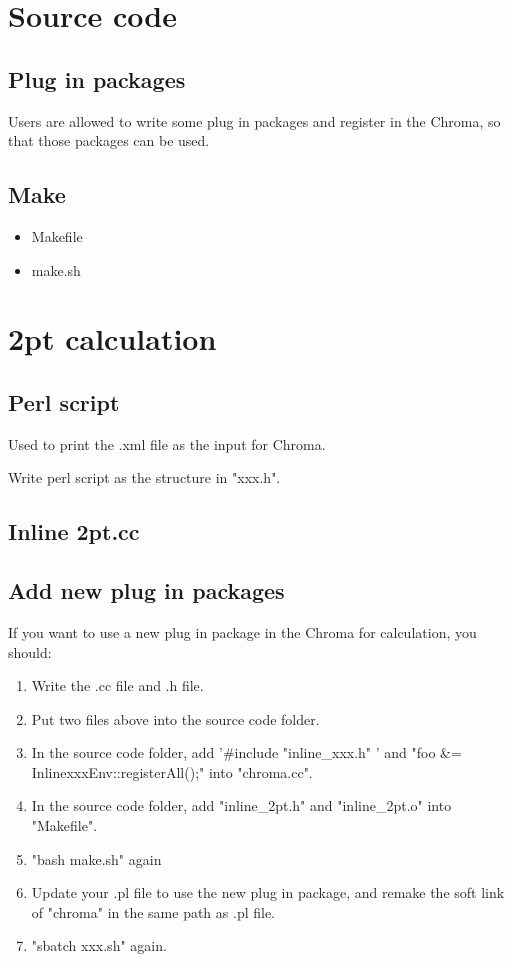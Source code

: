 \documentclass{article}
\begin{document}
\section{Source code}

\subsection{Plug in packages}

Users are allowed to write some plug in packages and register in the Chroma, so that those packages can be used.

\subsection{Make}

\begin{itemize}
    \item Makefile
    \item make.sh 
\end{itemize}

\section{2pt calculation}

\subsection{Perl script}

Used to print the .xml file as the input for Chroma.

Write perl script as the structure in "xxx.h".

\subsection{Inline 2pt.cc}




\subsection{Add new plug in packages}

If you want to use a new plug in package in the Chroma for calculation, you should:

\begin{enumerate}
    \item Write the .cc file and .h file.
    \item Put two files above into the source code folder.
    \item In the source code folder, add '\#include "inline\_xxx.h" ' and "foo \&= InlinexxxEnv::registerAll();" into "chroma.cc".
    \item In the source code folder, add "inline\_2pt.h" and "inline\_2pt.o" into "Makefile".
    \item "bash make.sh" again
    \item Update your .pl file to use the new plug in package, and remake the soft link of "chroma" in the same path as .pl file.
    \item "sbatch xxx.sh" again.
\end{enumerate}
\end{document}

